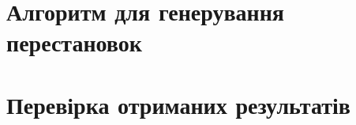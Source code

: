     \section{Алгоритм для генерування перестановок}
    \section{Перевірка отриманих результатів}
%         
%     
\newpage


